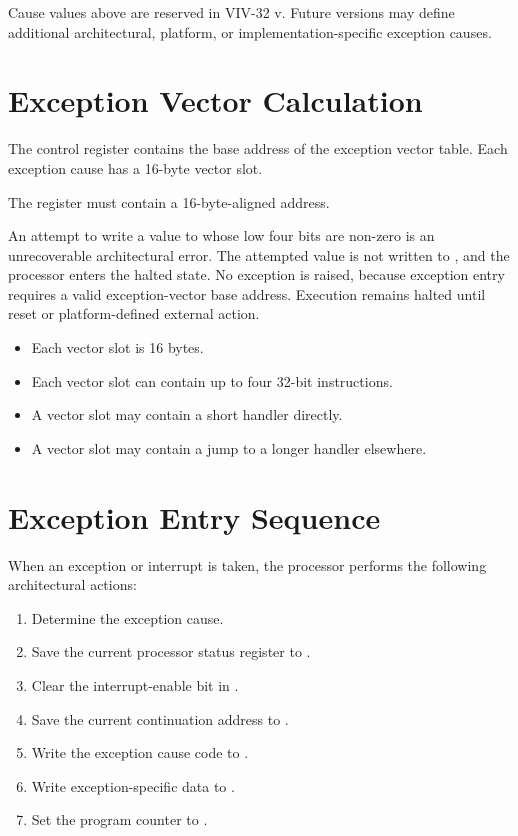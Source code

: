 \noindent
Cause values above  are reserved in VIV-32 v\version. Future versions
may define additional architectural, platform, or implementation-specific exception causes.

\section{Exception Vector Calculation}

The  control register contains the base address of the exception
vector table. Each exception cause has a 16-byte vector slot.

\begin{center}
\end{center}

\noindent
The  register must contain a 16-byte-aligned address.

An attempt to write a value to  whose low four bits are non-zero is an
unrecoverable architectural error. The attempted value is not written to ,
and the processor enters the halted state.
No exception is raised, because exception entry requires a valid exception-vector base address.
Execution remains halted until reset or platform-defined external action.

\begin{itemize}
\item Each vector slot is 16 bytes.
\item Each vector slot can contain up to four 32-bit instructions.
\item A vector slot may contain a short handler directly.
\item A vector slot may contain a jump to a longer handler elsewhere.
\end{itemize}

\section{Exception Entry Sequence}

When an exception or interrupt is taken, the processor performs the following architectural
actions:

\begin{enumerate}
\item Determine the exception cause.
\item Save the current processor status register to .
\item Clear the interrupt-enable bit in .
\item Save the current continuation address to .
\item Write the exception cause code to .
\item Write exception-specific data to .
\item Set the program counter to
.
\end{enumerate}

